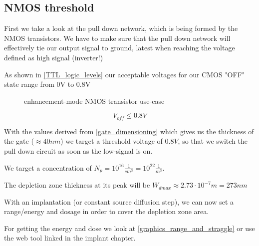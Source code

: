 \subsection{NMOS threshold}\label{nmos_dimensioning}
First we take a look at the pull down network, which is being formed by the NMOS transistors.
We have to make sure that the pull down network will effectively tie our output signal to ground, latest when reaching the voltage defined as high signal (inverter!)

As shown in  \autoref{TTL_logic_levels} our acceptable voltages for our CMOS "OFF" state range from 0V to 0.8V

\begin{figure}[H]
	\centering
	\begin{circuitdiagram}{20}{20}
	\end{circuitdiagram}
	\caption{enhancement-mode NMOS transistor use-case}
\end{figure}

\begin{equation}
V_{off} \leq 0.8 V
\end{equation}

With the values derived from \autoref{gate_dimensioning} which gives us the thickness of the gate ($\approx 40nm$) we target a threshold voltage of $0.8V$,  so that we switch the pull down circuit as soon as the low-signal is on.

We target a concentration of $N_p = 10^{16}\frac{1}{cm^3}=10^{22}\frac{1}{m^3}$.

The depletion zone thickness at its peak will be $W_{dmax} \approx 2.73 \cdot 10^{-7} m = 273 nm$

With an implantation (or constant source diffusion step), we can now set a range/energy and dosage in order to cover the depletion zone area.

For getting the energy and dose we look at \autoref{graphics_range_and_straggle} or use the web tool linked in the implant chapter.

